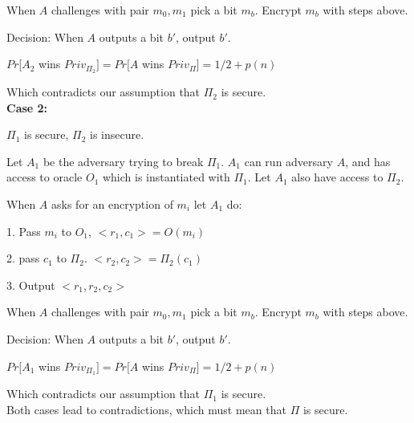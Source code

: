\documentclass[12pt]{article}
\newenvironment{question}[2][Question]{\begin{trivlist}
		\item[\hskip \labelsep {\bfseries #1}\hskip \labelsep {\bfseries #2.}]}{\end{trivlist}}
\begin{document}
\begin{question}{4}
		When $A$ challenges with pair $m_0, m_1$ pick a bit $m_b$. Encrypt $m_b$ with steps above. 
		
		Decision: When $A$ outputs a bit $b'$, output $b'$.
		
		$Pr[A_2$ wins $Priv_{\Pi_2}] = Pr[A$ wins $Priv_\Pi]=1/2 + p(n)$
		
		Which contradicts our assumption that $\Pi_2$ is secure.\\

		
		\textbf{Case 2:}
		
		$\Pi_1$ is secure, $\Pi_2$ is insecure. 
		
		Let $A_1$ be the adversary trying to break $\Pi_1$. $A_1$ can run adversary $A$, and has access to oracle $O_1$ which is instantiated with $\Pi_1$. Let $A_1$ also have access to $\Pi_2$.
		
		
		When $A$ asks for an encryption of $m_i$ let $A_1$ do:
		
		\hspace{\parindent} 1. Pass $m_i$ to $O_1$, $<r_1, c_1> = O(m_i)$
		
		\hspace{\parindent} 2. pass $c_1$ to $\Pi_2$. $<r_2, c_2> = \Pi_2(c_1)$
		
		
		\hspace{\parindent} 3. Output $<r_1, r_2, c_2>$
		
		When $A$ challenges with pair $m_0, m_1$ pick a bit $m_b$. Encrypt $m_b$ with steps above. 
		
		Decision: When $A$ outputs a bit $b'$, output $b'$.
		
		$Pr[A_1$ wins $Priv_{\Pi_1}] = Pr[A$ wins $Priv_\Pi]=1/2 + p(n)$
		
		Which contradicts our assumption that $\Pi_1$ is secure.\\
		
		
		
		Both cases lead to contradictions, which must mean that $\Pi$ is secure.
		
	\end{question}
		
		
	\clearpage
	
	
	
\end{document}
